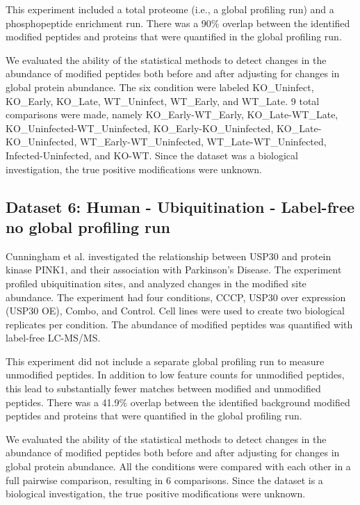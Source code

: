 \documentclass[mcp]{article}
\numberwithin{table}{section}
\begin{document}
\medskip {} This experiment included a total proteome (i.e., a global profiling run) and a phosphopeptide enrichment run. There was a 90\% overlap between the identified modified peptides and proteins that were quantified in the global profiling run.

\medskip {} We evaluated the ability of the statistical methods to detect changes in the abundance of modified peptides both before and after adjusting for changes in global protein abundance. The six condition were labeled KO\_Uninfect, KO\_Early, KO\_Late, WT\_Uninfect, WT\_Early, and WT\_Late. 9 total comparisons were made, namely KO\_Early-WT\_Early, KO\_Late-WT\_Late, KO\_Uninfected-WT\_Uninfected, KO\_Early-KO\_Uninfected, KO\_Late-KO\_Uninfected, WT\_Early-WT\_Uninfected, WT\_Late-WT\_Uninfected, Infected-Uninfected, and KO-WT. Since the dataset was a biological investigation, the true positive modifications were unknown.


\subsection*{Dataset 6: Human - Ubiquitination - Label-free no global profiling run}
\label{sec:exp_proc_dataset6}

\medskip {} Cunningham et al. \cite{Cunningham2015} investigated the relationship between USP30 and protein kinase PINK1, and their association with Parkinson’s Disease. The experiment profiled ubiquitination sites, and analyzed changes in the modified site abundance. The experiment had four conditions, CCCP, USP30 over expression (USP30 OE), Combo, and Control. Cell lines were used to create two biological replicates per condition. The abundance of modified peptides was quantified with label-free LC-MS/MS.

\medskip {} This experiment did not include a separate global profiling run to measure unmodified peptides. In addition to low feature counts for unmodified peptides,  this lead to substantially fewer matches between modified and unmodified peptides. There was a 41.9\% overlap between the identified background modified peptides and proteins that were quantified in the global profiling run.

\medskip {} We evaluated the ability of the statistical methods to detect  changes in the abundance of modified peptides both before and after adjusting for changes in global protein abundance. All the conditions were compared with each other in a full pairwise comparison, resulting in 6 comparisons. Since the dataset is a biological investigation, the true positive modifications were unknown.
\end{document}
